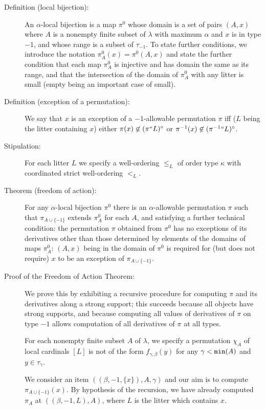 \documentclass[112pt]{article}
\begin{document}
\begin{description}

\item[Definition (local bijection):]  An $\alpha$-local bijection is a map $\pi^0$ whose domain is a set of pairs $(A,x)$ where $A$ is a nonempty finite subset of $\lambda$ with maximum $\alpha$ and $x$ is in type $-1$,  and whose range is a subset of $\tau_{-1}$.  To state further conditions, we introduce the notation $\pi^0_A(x) = \pi^0(A,x)$ and state the further condition that each map $\pi^0_A$ is injective and has domain the same as its range, and that the intersection of the domain of $\pi^0_A$ with any litter is small (empty being an important case of small).

\item[Definition (exception of a permutation):]  We say that $x$ is an exception of a $-1$-allowable permutation $\pi$ iff ($L$ being the litter containing $x$) either $\pi(x) \not\in (\pi``L)^\circ$ or $\pi^{-1}(x) \not\in (\pi^{-1}``L)^\circ$.

\item[Stipulation:]  For each litter $L$ we specify a well-ordering $\leq_L$ of order type $\kappa$ with coordinated strict well-ordering $<_L$.

\item[Theorem (freedom of action):]  For any $\alpha$-local bijection $\pi^0$ there is an $\alpha$-allowable permutation $\pi$ such that
$\pi_{A\cup \{-1\}}$ extends $\pi^0_A$ for each $A$, and satisfying a further technical condition:    the permutation $\pi$ obtained from $\pi^0$ has no exceptions of its derivatives other than those determined by elements of the domains of maps $\pi^0_A$:  $(A,x)$ being in the domain of $\pi^0$ is required for (but does not require) $x$ to be an exception of $\pi_{A \cup \{-1\}}$.

\item[Proof of the Freedom of Action Theorem:]  We prove this by exhibiting a recursive procedure for computing $\pi$ and its derivatives along a strong support;  this succeeds because all objects have
strong supports, and because computing all values of derivatives of $\pi$ on type $-1$ allows computation of all derivatives of $\pi$ at all types.

For each nonempty finite subset $A$ of $\lambda$, we specify a permutation $\chi_A$ of local cardinals $[L]$ is not of the form $f_{\gamma,\beta}(y)$ for any $\gamma<{\tt min}(A)$ and $y \in \tau_\gamma$.

We consider an item $((\beta,-1,\{x\}),A,\gamma)$ and our aim is to compute $\pi_{A \cup \{-1\}}(x)$.  By hypothesis of the recursion, we have already
computed $\pi_A$ at $((\beta,-1,L),A)$, where $L$ is the litter which contains $x$.


\end{description}
\end{document}
